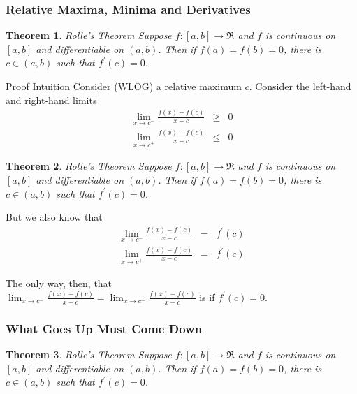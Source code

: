 \documentclass{beamer}
\newtheorem{thm}{Theorem}
\numberwithin{equation}{section}
\begin{document}
\begin{frame}
\frametitle{Relative Maxima, Minima and Derivatives}
\begin{thm} \alert{Rolle's Theorem} Suppose $f:[a,b] \rightarrow \Re$ and $f$ is continuous on $[a,b]$ and differentiable on $(a,b)$.  Then if $f(a) = f(b) = 0$, there is $c \in (a, b)$ such that $f^{'}(c) = 0$.  \end{thm}

Proof
\alert{Intuition} Consider (WLOG) a relative maximum $c$. Consider the left-hand and right-hand limits
\begin{eqnarray}
\lim_{x \rightarrow c^{-}} \frac{f(x) - f(c) }{x - c } & \geq & 0 \nonumber \\
\lim_{x \rightarrow c^{+}} \frac{f(x) - f(c) } {x - c }  & \leq & 0 \nonumber 
\end{eqnarray}






\end{frame}


\begin{frame}
\begin{thm} \alert{Rolle's Theorem} Suppose $f:[a,b] \rightarrow \Re$ and $f$ is continuous on $[a,b]$ and differentiable on $(a,b)$.  Then if $f(a) = f(b) = 0$, there is $c \in (a, b)$ such that $f^{'}(c) = 0$.  \end{thm}


But we also know that 
\begin{eqnarray}
\lim_{x \rightarrow c^{-}} \frac{f(x) - f(c ) }{x - c } & = & f^{'}(c) \nonumber \\
\lim_{x \rightarrow c^{+}} \frac{f(x) - f(c) } {x - c }  &  =  & f^{'}(c)  \nonumber 
\end{eqnarray}

The only way, then, that \\
$\lim_{x \rightarrow c^{-}} \frac{f(x) - f(c) }{x -c}  = \lim_{x \rightarrow c^{+}} \frac{f(x) - f(c) } {x - c} $ is if $f^{'}(c) = 0$.  


\end{frame}


\begin{frame}
\frametitle{What Goes Up Must Come Down}

\begin{thm} \alert{Rolle's Theorem} Suppose $f:[a,b] \rightarrow \Re$ and $f$ is continuous on $[a,b]$ and differentiable on $(a,b)$.  Then if $f(a) = f(b) = 0$, there is $c \in (a, b)$ such that $f^{'}(c) = 0$.  \end{thm}
\pause 


\begin{center}
\end{center}

\end{frame}
\end{document}
